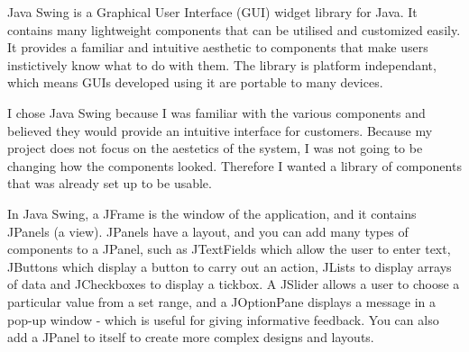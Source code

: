 Java Swing \cite{java_swing_2020} is a Graphical User Interface (GUI) widget library for Java. It contains many lightweight components that can be utilised and customized easily. It provides a familiar and intuitive aesthetic to components that make users instictively know what to do with them. The library is platform independant, which means GUIs developed using it are portable to many devices.

I chose Java Swing because I was familiar with the various components and believed they would provide an intuitive interface for customers. Because my project does not focus on the aestetics of the system, I was not going to be changing how the components looked. Therefore I wanted a library of components that was already set up to be usable. 

In Java Swing, a JFrame is the window of the application, and it contains JPanels (a view). JPanels have a layout, and you can add many types of components to a JPanel, such as JTextFields which allow the user to enter text, JButtons which display a button to carry out an action, JLists to display arrays of data and JCheckboxes to display a tickbox. A JSlider allows a user to choose a particular value from a set range, and a JOptionPane displays a message in a pop-up window - which is useful for giving informative feedback. You can also add a JPanel to itself to create more complex designs and layouts.

